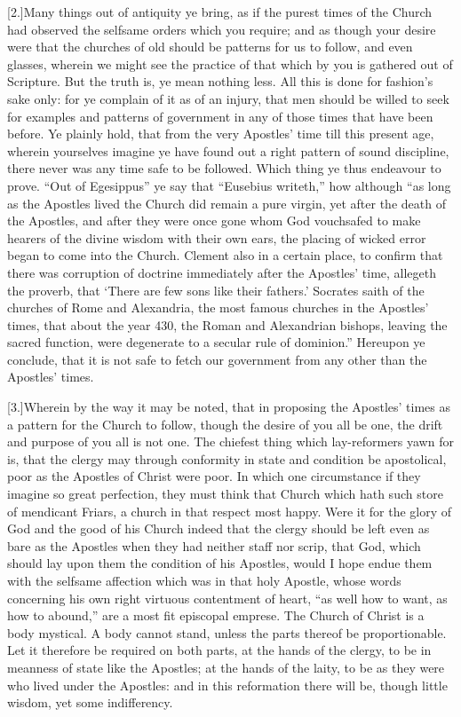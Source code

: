 [2.]Many things out of antiquity ye bring, as if the purest times of the Church had observed the selfsame orders which you require; and as though your desire were that the churches of old should be patterns for us to follow, and even glasses, wherein we might see the practice of that which by you is gathered out of Scripture. But the truth is, ye mean nothing less. All this is done for fashion’s sake only: for ye complain of it as of an injury, that men should be willed to seek for examples and patterns of government in any of those times that have been before. Ye plainly hold, that from the very Apostles’ time till this present age, wherein yourselves imagine ye have found out a right pattern of sound discipline, there never was any time safe to be followed. Which thing ye thus endeavour to prove. “Out of Egesippus” ye say that “Eusebius writeth,” how although “as long as the Apostles lived the Church did remain a pure virgin, yet after the death of the Apostles, and after they were once gone whom God vouchsafed to make hearers of the divine wisdom with their own ears, the placing of wicked error began to come into the Church. Clement also in a certain place, to confirm that there was corruption of doctrine immediately after the Apostles’ time, allegeth the proverb, that ‘There are few sons like their fathers.’ Socrates saith of the churches of Rome and Alexandria, the most famous churches in the Apostles’ times, that about the year 430, the Roman and Alexandrian bishops, leaving the sacred function, were degenerate to a secular rule of dominion.” Hereupon ye conclude, that it is not safe to fetch our government from any other than the Apostles’ times.

[3.]Wherein by the way it may be noted, that in proposing the Apostles’ times as a pattern for the Church to follow, though the desire of you all be one, the drift and purpose of you all is not one. The chiefest thing which lay-reformers yawn for is, that the clergy may through conformity in state and condition be apostolical, poor as the Apostles of Christ were poor. In which one circumstance if they imagine so great perfection, they must think that Church which hath such store of mendicant Friars, a church in that respect most happy. Were it for the glory of God and the good of his Church indeed that the clergy should be left even as bare as the Apostles when they had neither staff nor scrip, that God, which should lay upon them the condition of his Apostles, would I hope endue them with the selfsame affection which was in that holy Apostle, whose words concerning his own right virtuous contentment of heart, “as well how to want, as how to abound,” are a most fit episcopal emprese. The Church of Christ is a body mystical. A body cannot stand, unless the parts thereof be proportionable. Let it therefore be required on both parts, at the hands of the clergy, to be in meanness of state like the Apostles; at the hands of the laity, to be as they were who lived under the Apostles: and in this reformation there will be, though little wisdom, yet some indifferency.

